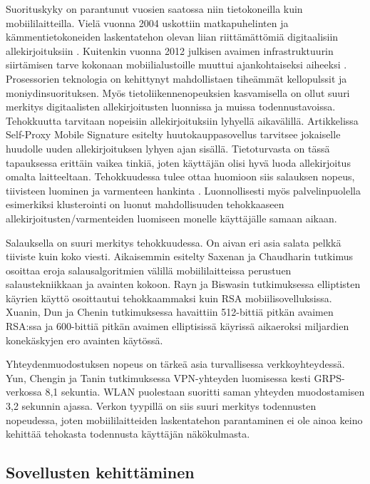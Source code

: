 \documentclass[finnish]{tktltiki2}
\theoremstyle{definition}
\theoremstyle{remark}
\begin{document}
Suorituskyky on parantunut vuosien saatossa niin tietokoneilla kuin mobiililaitteilla. Vielä vuonna 2004 uskottiin matkapuhelinten ja kämmentietokoneiden laskentatehon olevan liian riittämättömiä digitaalisiin allekirjoituksiin \cite{gene}. Kuitenkin vuonna 2012 julkisen avaimen infrastruktuurin siirtämisen tarve kokonaan mobiilialustoille muuttui ajankohtaiseksi aiheeksi \cite{ECC}. Prosessorien teknologia on kehittynyt mahdollistaen tiheämmät kellopulssit ja moniydinsuorituksen. Myös tietoliikennenopeuksien kasvamisella on ollut suuri merkitys digitaalisten allekirjoitusten luonnissa ja muissa todennustavoissa. Tehokkuutta tarvitaan nopeisiin allekirjoituksiin lyhyellä aikavälillä. Artikkelissa Self-Proxy Mobile Signature \cite{proxy} esitelty huutokauppasovellus tarvitsee jokaiselle huudolle uuden  allekirjoituksen lyhyen ajan sisällä. Tietoturvasta on tässä tapauksessa erittäin vaikea tinkiä, joten käyttäjän olisi hyvä luoda allekirjoitus omalta laitteeltaan. Tehokkuudessa tulee ottaa huomioon siis salauksen nopeus, tiivisteen luominen ja varmenteen hankinta \cite{proxy}. Luonnollisesti myös palvelinpuolella esimerkiksi klusterointi on luonut mahdollisuuden tehokkaaseen allekirjoitusten/varmenteiden luomiseen monelle käyttäjälle samaan aikaan.

Salauksella on suuri merkitys tehokkuudessa. On aivan eri asia salata pelkkä tiiviste kuin koko viesti. Aikaisemmin esitelty Saxenan ja Chaudharin \cite{gsm} tutkimus osoittaa eroja salausalgoritmien välillä mobiililaitteissa perustuen salaustekniikkaan ja avainten kokoon. Rayn ja Biswasin \cite{ECC} tutkimuksessa elliptisten käyrien käyttö osoittautui tehokkaammaksi kuin RSA mobiilisovelluksissa. Xuanin, Dun ja Chenin \cite{webs} tutkimuksessa havaittiin 512-bittiä pitkän avaimen RSA:ssa ja 600-bittiä pitkän avaimen elliptisissä käyrissä aikaeroksi miljardien konekäskyjen ero avainten käytössä.

Yhteydenmuodostuksen nopeus on tärkeä asia turvallisessa verkkoyhteydessä. Yun, Chengin ja Tanin \cite{vpn} tutkimuksessa VPN-yhteyden luomisessa kesti GRPS-verkossa 8,1 sekuntia. WLAN puolestaan suoritti saman yhteyden muodostamisen 3,2 sekunnin ajassa. Verkon tyypillä on siis suuri merkitys todennusten nopeudessa, joten mobiililaitteiden laskentatehon parantaminen ei ole ainoa keino kehittää tehokasta todennusta käyttäjän näkökulmasta.   


\subsection{Sovellusten kehittäminen}
\end{document}

